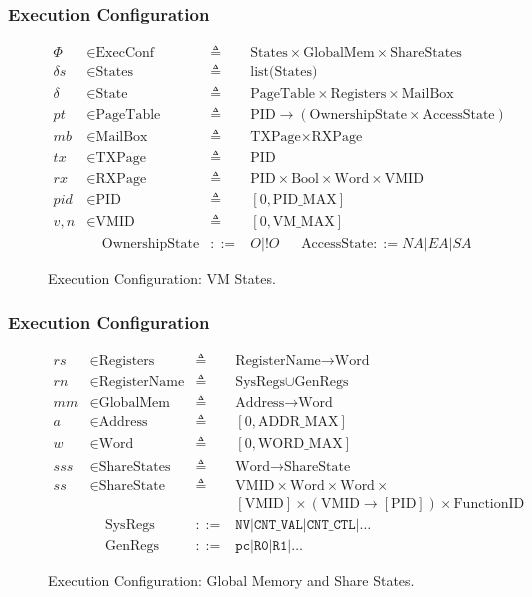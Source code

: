 \documentclass{beamer}
\newcommand*{\defined}{\triangleq}
\newcommand*{\maps}{\rightarrow}
\newcommand*{\derived}{::=}
\newcommand*{\CONF}{\text{ExecConf}}
\newcommand*{\STATE}{\text{State}}
\newcommand*{\MEM}{\text{GlobalMem}}
\newcommand*{\SSS}{\text{ShareStates}}
\newcommand*{\PID}{\text{PID}}
\newcommand*{\PT}{\text{PageTable}}
\newcommand*{\AS}{\text{AccessState}}
\newcommand*{\OS}{\text{OwnershipState}}
\newcommand*{\REGS}{\text{Registers}}
\newcommand*{\ADDR}{\text{Address}}
\newcommand*{\WORD}{\text{Word}}
\newcommand*{\VMID}{\text{VMID}}
\newcommand*{\REGNAMES}{\text{RegisterName}}
\newcommand*{\MB}{\text{MailBox}}
\newcommand*{\PAMAX}{\text{ADDR\_MAX}}
\newcommand*{\PPIDMAX}{\text{PID\_MAX}}
\newcommand*{\PWMAX}{\text{WORD\_MAX}}
\newcommand*{\PVMMAX}{\text{VM\_MAX}}
\begin{document}
\begin{frame}
  \frametitle{Execution Configuration}
\begin{figure}
  \begin{align*}
    \Phi &\in \CONF &\defined &\text{States} \times \MEM \times \SSS \\
    \delta s &\in \text{States} &\defined &\text{list(States)} \\
    \delta &\in \STATE &\defined &\PT \times \REGS \times \MB \\
    pt & \in \PT & \defined & \PID \maps (\OS \times \AS) \\
    mb & \in \MB &\defined &\text{TXPage} \times  \text{RXPage}\\
    tx & \in \text{TXPage} &\defined &\PID\\
    rx & \in \text{RXPage} &\defined &\PID \times \text{Bool} \times \WORD \times \VMID \\
    pid & \in \PID &\defined  &[ 0, \PPIDMAX ] \\
     v,n & \in \VMID &\defined  &[ 0, \PVMMAX ] \\
      & \;\;\;\; \OS & \derived & O | !O  ~~~~~~~  \AS  \derived  NA | EA | SA
  \end{align*}
  \caption{Execution Configuration: VM States.}
\end{figure}

\end{frame}

\begin{frame}
  \frametitle{Execution Configuration}
\begin{figure}
  \begin{align*}
      rs & \in \REGS &\defined  &\REGNAMES \maps \WORD \\
    rn & \in \REGNAMES &\defined &\text{SysRegs} \cup \text{GenRegs}\\
    mm & \in \MEM &\defined  &\ADDR \maps \WORD \\
    a & \in \ADDR &\defined  &[ 0, \PAMAX ] \\
    w & \in \WORD &\defined  &[ 0, \PWMAX ] \\
    sss & \in \SSS &\defined  &\WORD \maps \text{ShareState} \\
    ss & \in \text{ShareState} &\defined &\VMID \times \WORD \times \WORD \times\\
                                        &&&   [\VMID] \times (\VMID \maps [\PID]) \times \text{FunctionID}\\
      & \;\;\;\; \text{SysRegs} &\derived & \mathtt{NV} | \mathtt{CNT\_VAL} | \mathtt{CNT\_CTL} | \dots \\
         & \;\;\;\; \text{GenRegs} &\derived & \mathtt{pc} | \mathtt {R0} | \mathtt{R1} | \dots
  \end{align*}
  \caption{Execution Configuration: Global Memory and Share States.}
\end{figure}

\end{frame}
\end{document}
